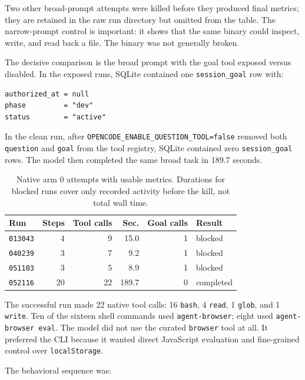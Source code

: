 \documentclass[11pt]{article}
\newcommand{\code}[1]{\texttt{#1}}
\begin{document}
Two other broad-prompt attempts were killed before they produced final metrics;
they are retained in the raw run directory but omitted from the table.  The
narrow-prompt control is important: it shows that the same binary could inspect,
write, and read back a file.  The binary was not generally broken.

The decisive comparison is the broad prompt with the goal tool exposed versus
disabled.  In the exposed runs, SQLite contained one \code{session\_goal} row
with:

\begin{lstlisting}[style=json]
authorized_at = null
phase         = "dev"
status        = "active"
\end{lstlisting}

In the clean run, after \code{OPENCODE\_ENABLE\_QUESTION\_TOOL=false} removed
both \code{question} and \code{goal} from the tool registry, SQLite contained
zero \code{session\_goal} rows.  The model then completed the same broad task in
189.7 seconds.

\begin{table}[h]
\centering
\small
\begin{tabular}{lrrrrl}
\toprule
\textbf{Run} & \textbf{Steps} & \textbf{Tool calls} & \textbf{Sec.} & \textbf{Goal calls} & \textbf{Result} \\
\midrule
\code{013043} & 4 & 9 & 15.0 & 1 & blocked \\
\code{040239} & 3 & 7 & 9.2 & 1 & blocked \\
\code{051103} & 3 & 5 & 8.9 & 1 & blocked \\
\code{052116} & 20 & 22 & 189.7 & 0 & completed \\
\bottomrule
\end{tabular}
\caption{Native arm 0 attempts with usable metrics.  Durations for blocked runs
cover only recorded activity before the kill, not total wall time.}
\end{table}

The successful run made 22 native tool calls: 16 \code{bash}, 4 \code{read},
1 \code{glob}, and 1 \code{write}.  Ten of the sixteen shell commands used
\code{agent-browser}; eight used \code{agent-browser eval}.  The model did not
use the curated \code{browser} tool at all.  It preferred the CLI because it
wanted direct JavaScript evaluation and fine-grained control over
\code{localStorage}.

The behavioral sequence was:
\end{document}
